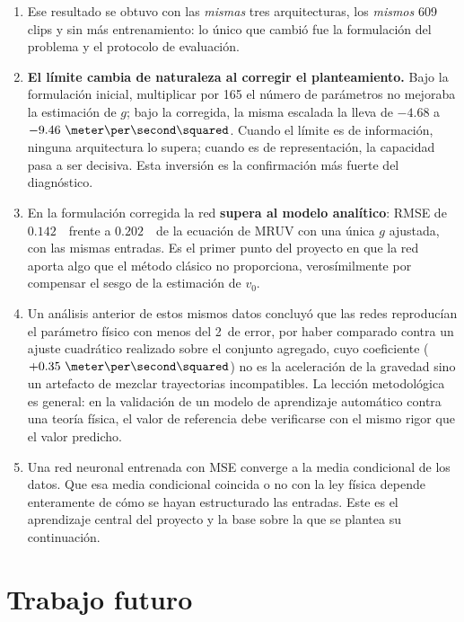 \documentclass[titlepage,11pt]{article}
\providecommand{\num}[1]{\ensuremath{#1}}
\providecommand{\SI}[2]{#1\,#2}
\providecommand{\percent}{\char37\relax}
\begin{document}
\begin{enumerate}
\item Ese resultado se obtuvo con las \emph{mismas} tres arquitecturas, los
  \emph{mismos} 609 clips y sin más entrenamiento: lo único que cambió fue la
  formulación del problema y el protocolo de evaluación.

\item \textbf{El límite cambia de naturaleza al corregir el planteamiento.}
  Bajo la formulación inicial, multiplicar por 165 el número de parámetros no
  mejoraba la estimación de $g$; bajo la corregida, la misma escalada la lleva
  de $\num{-4.68}$ a $\num{-9.46}~\meter\per\second\squared$. Cuando el límite
  es de información, ninguna arquitectura lo supera; cuando es de
  representación, la capacidad pasa a ser decisiva. Esta inversión es la
  confirmación más fuerte del diagnóstico.

\item En la formulación corregida la red \textbf{supera al modelo analítico}:
  RMSE de \num{0.142}~\meter\ frente a \num{0.202}~\meter\ de la ecuación de
  MRUV con una única $g$ ajustada, con las mismas entradas. Es el primer punto
  del proyecto en que la red aporta algo que el método clásico no proporciona,
  verosímilmente por compensar el sesgo de la estimación de $v_0$.

\item Un análisis anterior de estos mismos datos concluyó que las redes
  reproducían el parámetro físico con menos del \SI{2}{\percent} de error, por
  haber comparado contra un ajuste cuadrático realizado sobre el conjunto
  agregado, cuyo coeficiente ($\num{+0.35}~\meter\per\second\squared$) no es la
  aceleración de la gravedad sino un artefacto de mezclar trayectorias
  incompatibles. La lección metodológica es general: en la validación de un
  modelo de aprendizaje automático contra una teoría física, el valor de
  referencia debe verificarse con el mismo rigor que el valor predicho.

\item Una red neuronal entrenada con MSE converge a la media condicional de los
  datos. Que esa media condicional coincida o no con la ley física depende
  enteramente de cómo se hayan estructurado las entradas. Este es el aprendizaje
  central del proyecto y la base sobre la que se plantea su continuación.
\end{enumerate}


\section{Trabajo futuro}
\label{sec:trabajofuturo}
\end{document}

